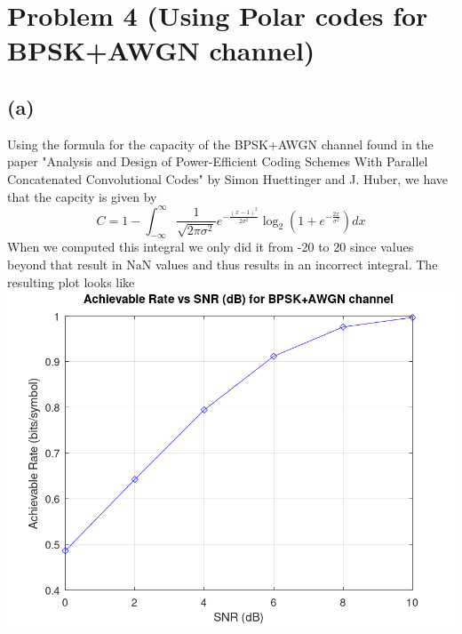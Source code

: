 \documentclass[a4paper,10pt]{article}
\begin{document}
\section{Problem 4 (Using Polar codes for BPSK+AWGN channel)}
\subsection{(a)}
Using the formula for the capacity of the BPSK+AWGN channel found in 
the paper 
"Analysis and Design of Power-Efficient Coding Schemes With Parallel Concatenated Convolutional Codes"
by Simon Huettinger and J. Huber,
we have that the capcity is given by  
\begin{equation}
    C=1-\int_{-\infty}^{\infty} \frac{1}{\sqrt{2\pi\sigma^2}}e^{-\frac{(x-1)^2}{2\sigma^2}}\log_2(1+e^{-\frac{2x}{\sigma^2}})dx
\end{equation}
When we computed this integral we only did it from -20 to 20 since values
beyond that result in NaN values and thus results in an incorrect integral. The resulting
plot looks like\\
\includegraphics[scale=0.3]{code/Achievable Rate vs SNR (dB) for BPSK+AWGN channel.png}
\end{document}
